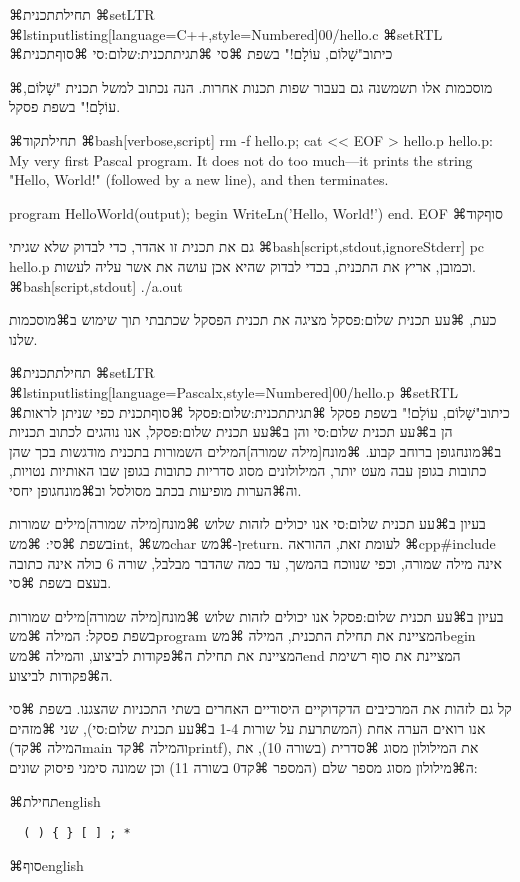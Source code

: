 ⌘תחילת{תכנית}
⌘setLTR
⌘lstinputlisting[language=C++,style=Numbered]{00/hello.c}
⌘setRTL
⌘כיתוב{"שָׁלוֹם, עוֹלָם!" בשפת ⌘סי}
⌘תגית{תכנית:שלום:סי}
⌘סוף{תכנית}

⌘מוסכמות אלו תשמשנה גם בעבור שפות תכנות אחרות. הנה נכתוב למשל תכנית "שָׁלוֹם,
עוֹלָם!" בשפת פסקל.

⌘תחילת{קוד}
⌘bash[verbose,script]
rm -f hello.p; cat << EOF > hello.p
{hello.p: My very first Pascal program. It does not do
  too much---it prints the string "Hello, World!" (followed
by a new line), and then terminates.}

program HelloWorld(output);
begin
  WriteLn('Hello, World!')
end.
EOF
\END
⌘סוף{קוד}

גם את תכנית זו אהדר, כדי לבדוק שלא שגיתי
⌘bash[script,stdout,ignoreStderr]
pc hello.p
\END
וכמובן, אריץ את התכנית, בכדי לבדוק שהיא אכן עושה את אשר עליה לעשות.
⌘bash[script,stdout]
./a.out
\END

כעת, ⌘עע תכנית שלום:פסקל מציגה את תכנית הפסקל שכתבתי תוך שימוש ב⌘מוסכמות שלנו.

⌘תחילת{תכנית}
⌘setLTR
⌘lstinputlisting[language=Pascalx,style=Numbered]{00/hello.p}
⌘setRTL
⌘כיתוב{"שָׁלוֹם, עוֹלָם!" בשפת פסקל}
⌘תגית{תכנית:שלום:פסקל}
⌘סוף{תכנית}
כפי שניתן לראות הן ב⌘עע תכנית שלום:סי והן ב⌘עע תכנית שלום:פסקל, אנו נוהגים
לכתוב תכניות ב⌘מונח{גופן ברוחב קבוע}. ⌘מונח[מילה שמורה]{המילים השמורות} בתכנית
מודגשות בכך שהן כתובות בגופן עבה מעט יותר, המילולונים מסוג סדריות כתובות בגופן
שבו האותיות נטויות, וה⌘הערות מופיעות בכתב מסולסל וב⌘מונח{גופן יחסי}.

בעיון ב⌘עע תכנית שלום:סי אנו יכולים לזהות שלוש ⌘מונח[מילה שמורה]{מילים שמורות}
בשפת ⌘סי: ⌘מש{int}, ⌘מש{char} וְ-⌘מש{return}. לעומת זאת, ההוראה ⌘cpp{\#include}
אינה מילה שמורה, וכפי שנווכח בהמשך, עד כמה שהדבר מבלבל, שורה 6 כולה אינה כתובה
בעצם בשפת ⌘סי.

בעיון ב⌘עע תכנית שלום:פסקל אנו יכולים לזהות שלוש ⌘מונח[מילה שמורה]{מילים
  שמורות} בשפת פסקל: המילה ⌘מש{program} המציינת את תחילת התכנית, המילה
⌘מש{begin} המציינת את תחילת ה⌘פקודות לביצוע, והמילה ⌘מש{end} המציינת את סוף
רשימת ה⌘פקודות לביצוע.

קל גם לזהות את המרכיבים הדקדוקיים היסודיים האחרים בשתי התכניות שהצגנו. בשפת
⌘סי אנו רואים הערה אחת (המשתרעת על שורות 1-4 ב⌘עע תכנית שלום:סי), שני ⌘מזהים
(המילה ⌘קד{main} והמילה ⌘קד{printf}), את המילולון מסוג ⌘סדרית (בשורה 10), את
ה⌘מילולון מסוג מספר שלם (המספר ⌘קד{0} בשורה 11) וכן שמונה סימני פיסוק שונים:

⌘תחילת{english}
\let\ttfamily=\listingsfont
\begin{verbatim}
  ( ) { } [ ] ; *
\end{verbatim}
⌘סוף{english}

